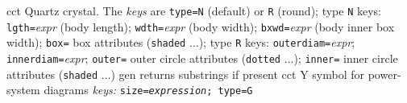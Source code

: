 %
  {cct}
  {Quartz crystal. The {\sl keys} are
     {\tt type=N} (default) or {\tt R} (round);
            type {\tt N} keys:
              {\tt lgth=}{\sl expr} (body length);
              {\tt wdth=}{\sl expr} (body width);
              {\tt bxwd=}{\sl expr} (body inner box width);
              {\tt box=} box attributes ({\tt shaded} $\ldots$);
            type {\tt R} keys:
              {\tt outerdiam=}{\sl expr};
              {\tt innerdiam=}{\sl expr};
              {\tt outer=} outer circle attributes ({\tt dotted} $\ldots$);
              {\tt inner=} inner circle attributes ({\tt shaded} $\ldots$)%
}
  {gen}
  {returns substrings if present}
%
  {cct}
  {Y symbol for power-system diagrams
   {\sl keys:} {\tt size={\sl expression}; type=G}}
